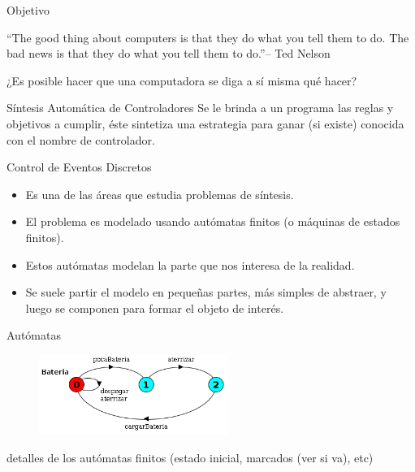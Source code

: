 \begin{frame}{Objetivo}
    \begin{block}{}
    ``The good thing about computers is that they do what you tell them to do. The bad news is that they do what you tell them to do.''\hfill – Ted Nelson 
    \end{block}
    
    \pause
    ¿Es posible hacer que una computadora se diga a sí misma qué hacer?
    
    \pause
    \begin{block}{Síntesis Automática de Controladores}
     Se le brinda a un programa las reglas y objetivos a cumplir, éste sintetiza una estrategia para ganar (si existe) conocida con el nombre de controlador.
    \end{block}

\end{frame}
\begin{frame}{Control de Eventos Discretos}
    \begin{itemize}
     \item Es una de las áreas que estudia problemas de síntesis.
     \item El problema es modelado usando autómatas finitos (o máquinas de estados finitos).
     \pause
     \item Estos autómatas modelan la parte que nos interesa de la realidad.
     \item Se suele partir el modelo en pequeñas partes, más simples de abstraer, y luego se componen para formar el objeto de interés.
    \end{itemize}
\end{frame}
\begin{frame}{Autómatas} 
    \begin{figure}
     \includegraphics[width=0.55\textwidth]{figures/bateria.png}
    \end{figure}


    detalles de los autómatas finitos (estado inicial, marcados (ver si va), etc)
\end{frame}
